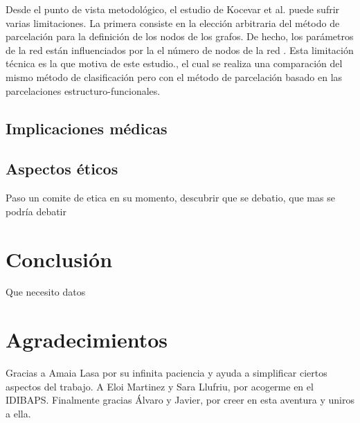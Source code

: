 \documentclass[fleqn,12pt]{UICArticle} %
\begin{document}
Desde el punto de vista metodológico, el estudio de Kocevar et al. \cite{Kocevar2016} puede sufrir varias limitaciones. La primera consiste en la elección arbitraria del método de parcelación para la definición de los nodos de los grafos. De hecho, los parámetros de la red están influenciados por la el número de nodos de la red \cite{Zalesky2010}. Esta limitación técnica es la que motiva  de este estudio., el cual se realiza una comparación del mismo método de clasificación pero con el método de parcelación basado en las parcelaciones estructuro-funcionales.


\subsection{Implicaciones médicas}

\subsection{Aspectos éticos}
Paso un comite de etica en su momento, descubrir que se debatio, que mas se podría debatir


\section{Conclusión}

Que necesito datos

\section*{Agradecimientos}
Gracias a Amaia Lasa por su infinita paciencia y ayuda a simplificar ciertos aspectos del trabajo. A Eloi Martinez y Sara Llufriu, por acogerme en el IDIBAPS. Finalmente gracias Álvaro y Javier, por creer en esta aventura y uniros a ella.






\end{document}
